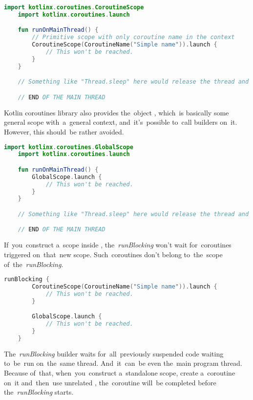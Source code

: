 \begin{lstlisting}[language=Kotlin]
    import kotlinx.coroutines.CoroutineScope
    import kotlinx.coroutines.launch

    fun runOnMainThread() {
        // Primitive scope with only coroutine name in the context
        CoroutineScope(CoroutineName("Simple name")).launch {
            // This won't be reached.
        }
    }

    // Something like "Thread.sleep" here would release the thread and the callback would run.

    // END OF THE MAIN THREAD
\end{lstlisting}
\newline

\noindent Kotlin coroutines library also provides the~object , which~is basically some general scope with~a~general context, and~it's~possible to~call builders on~it.
However, this should~be rather avoided.

\begin{lstlisting}[language=Kotlin]
    import kotlinx.coroutines.GlobalScope
    import kotlinx.coroutines.launch

    fun runOnMainThread() {
        GlobalScope.launch {
            // This won't be reached.
        }
    }

    // Something like "Thread.sleep" here would release the thread and the callback would run.

    // END OF THE MAIN THREAD
\end{lstlisting}

\warning If~you~construct a~scope inside , \mbox{the \textit{runBlocking}} won't wait for~coroutines triggered on~that~new scope.
Such~coroutines don't belong to~the~scope \mbox{of the \textit{runBlocking}.}

\begin{lstlisting}[language=Kotlin]
    runBlocking {
        CoroutineScope(CoroutineName("Simple name")).launch {
            // This won't be reached.
        }

        GlobalScope.launch {
            // This won't be reached.
        }
    }
\end{lstlisting}

\note \mbox{The \textit{runBlocking}} builder waits for~all~previously suspended code waiting to~be~run on~the~same thread.
And~it~can~be even the~main program thread.
Because of~that, when~you~construct a~standalone scope, create a~coroutine on~it and~then~use unrelated , the~coroutine will~be completed before \mbox{the \textit{runBlocking}} starts.

